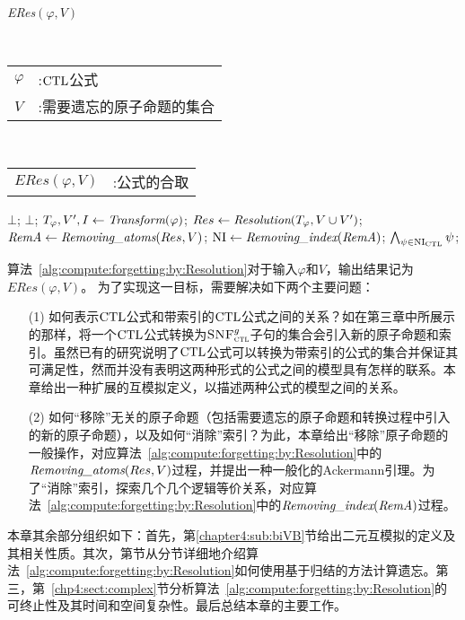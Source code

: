\begin{algorithm}[htbp]
	\small
	\caption{\emph{ERes}$(\varphi, V)$}
	\label{alg:compute:forgetting:by:Resolution}
	\begin{algorithmic}[1]
		\REQUIRE ~~\\
		\begin{tabular}[t]{p{8mm}l}
			$\varphi$&:$\textrm{CTL}$公式\\
			$V$&:需要遗忘的原子命题的集合
		\end{tabular}
		\ENSURE ~~\\
		\begin{tabular}[t]{p{8mm}l}
			$ERes(\varphi, V)$&\qquad:公式的合取
		\end{tabular}
		\RETURN $\bot$;
		\ENDIF
		\RETURN $\bot$;
		\ENDIF
		\STATE $T_{\varphi}, V', I \leftarrow \emph{Transform}(\varphi)$;
		\STATE $Res \leftarrow \emph{Resolution}(T_{\varphi}, V\cup V')$;
		\STATE $\emph{RemA} \leftarrow \emph{Removing\_atoms}(Res, V)$;
		\STATE $\textrm{NI} \leftarrow \emph{Removing\_index}(\emph{RemA})$;
		\RETURN $\bigwedge_{\psi \in \textrm{NI}_{\textrm{CTL}}} \psi$;
	\end{algorithmic}
\end{algorithm}


算法~\ref{alg:compute:forgetting:by:Resolution}对于输入$\varphi$和$V$，输出结果记为$ERes(\varphi, V)$。
为了实现这一目标，需要解决如下两个主要问题：
\begin{itemize}
	\item[(1)] 如何表示$\textrm{CTL}$公式和带索引的$\textrm{CTL}$公式之间的关系？如在第三章中所展示的那样，将一个$\textrm{CTL}$公式转换为${\textsc{SNF}_{\textsc{ctl}}^g}$子句的集合会引入新的原子命题和索引。虽然已有的研究说明了$\textrm{CTL}$公式可以转换为带索引的公式的集合并保证其可满足性，然而并没有表明这两种形式的公式之间的模型具有怎样的联系。本章给出一种扩展的互模拟定义，以描述两种公式的模型之间的关系。
	\item[(2)] 如何“移除”无关的原子命题（包括需要遗忘的原子命题和转换过程中引入的新的原子命题），以及如何“消除”索引？为此，本章给出“移除”原子命题的一般操作，对应算法~\ref{alg:compute:forgetting:by:Resolution}中的$\emph{Removing\_atoms}(Res, V)$过程，并提出一种一般化的Ackermann引理。为了“消除”索引，探索几个几个逻辑等价关系，对应算法~\ref{alg:compute:forgetting:by:Resolution}中的$\emph{Removing\_index}(\emph{RemA})$过程。
\end{itemize}

本章其余部分组织如下：首先，第\ref{chapter4:sub:biVB}节给出二元互模拟的定义及其相关性质。其次，第\label{chp4:sect:res}节从分节详细地介绍算法~\ref{alg:compute:forgetting:by:Resolution}如何使用基于归结的方法计算遗忘。第三，第~\ref{chp4:sect:complex}节分析算法~\ref{alg:compute:forgetting:by:Resolution}的可终止性及其时间和空间复杂性。最后总结本章的主要工作。



